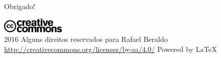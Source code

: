 \begin{frame}[standout]
  \Huge
  Obrigado!
\end{frame}

\begin{frame}
  \begin{center}
    \vspace{2em}
    \includegraphics[width=3cm]{imagens/cc}\\
    2016 Alguns direitos reservados para Rafael Beraldo
    \vspace{1em}
    \url{http://creativecommons.org/licenses/by-sa/4.0/}
    \vfill
    \huge{Powered by \LaTeX{}}
  \end{center}
\end{frame}
